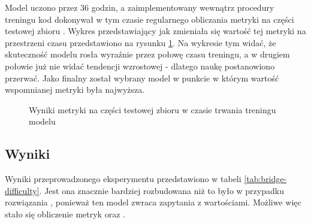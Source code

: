 Model uczono przez 36 godzin, a zaimplementowany wewnątrz procedury treningu kod dokonywał w tym czasie regularnego obliczania metryki  na części testowej zbioru . Wykres przedstawiający jak zmieniała się wartość tej metryki na przestrzeni czasu przedstawiono na rysunku \ref{plot:bridge-accuracy}. Na wykresie tym widać, że skuteczność modelu rosła wyraźnie przez połowę czasu treningu, a w drugiem połowie już nie widać tendencji wzrostowej - dlatego naukę postanowiono przerwać. Jako finalny został wybrany model w punkcie w którym wartość wspomnianej metryki była najwyższa.

\begin{figure}[ht!]
  \begin{center}
    \caption{Wyniki metryki  na części testowej zbioru  w czasie trwania treningu modelu}
    \label{plot:bridge-accuracy}
  \end{center}
\end{figure}

\subsection{Wyniki}
Wyniki przeprowadzonego eksperymentu przedstawiono w tabeli \ref{tab:bridge-difficulty}. Jest ona znacznie bardziej rozbudowana niż to było w przypadku rozwiązania , ponieważ ten model zwraca zapytania z wartościami. Możliwe więc stało się obliczenie metryk  oraz .

